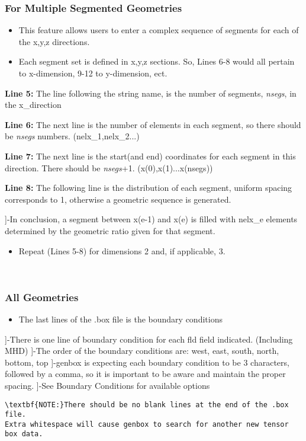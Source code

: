 \subsubsection{ For Multiple Segmented Geometries}
\begin{itemize}\item This feature allows users to enter a complex sequence of segments for each of the x,y,z directions.  
    \item Each segment set is defined in x,y,z sections.  So, Lines 6-8 would all pertain to x-dimension, 9-12 to y-dimension, ect.
  \end{itemize}
  \par \textbf{Line 5:} The line following the string name, is the number of segments, \textit{nsegs}, in the x\_direction
  \par \textbf{Line 6:} The next line is the number of elements in each segment, so there should be \textit{nsegs} numbers. (nelx\_1,nelx\_2...)
  \par \textbf{Line 7:} The next line is the start(and end) coordinates for each segment in this direction.  There should be \textit{nsegs}+1. (x(0),x(1)...x(nsegs))
  \par \textbf{Line 8:} The following line is the distribution of each segment, uniform spacing corresponds to 1, otherwise a geometric sequence is generated.

\begin{description}]-In conclusion, a segment between x(e-1) and x(e) is filled with nelx\_e elements determined by the geometric ratio given for that segment.
\end{description}
\begin{itemize}\item Repeat (Lines 5-8) for dimensions 2 and, if applicable, 3.
  \end{itemize}
  \par \\

  \subsubsection{ All Geometries}
\begin{itemize}\item The last lines of the .box file is the boundary conditions
  \end{itemize}
\begin{description}]-There is one line of boundary condition for each fld field indicated. (Including MHD)
  ]-The order of the boundary conditions are: west, east, south, north, bottom, top 
]-genbox is expecting each boundary condition to be 3 characters, followed by a comma, so it is important to be aware and maintain the proper  spacing.
]-See Boundary Conditions for available options
\end{description}
\begin{verbatim}\textbf{NOTE:}There should be no blank lines at the end of the .box file.  
Extra whitespace will cause genbox to search for another new tensor box data.
\end{verbatim}
\par \\


